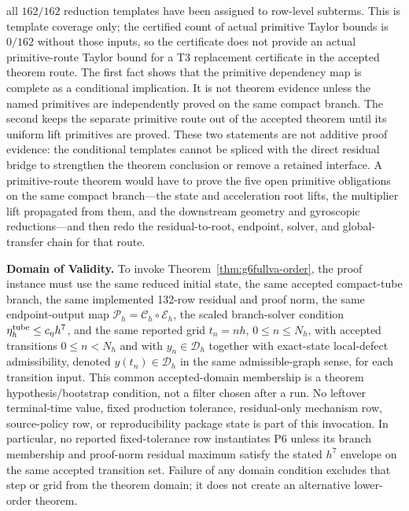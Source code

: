 \documentclass[preprint,12pt]{elsarticle}
\begin{document}
all \(162/162\) reduction
templates have been assigned to row-level subterms. This is template
coverage only; the certified count of actual primitive Taylor bounds is \(0/162\) without
those inputs, so the certificate does not provide an actual primitive-route
Taylor bound for a T3 replacement certificate in the accepted theorem route.
The first fact shows that the primitive dependency map is complete as a
conditional implication. It is not theorem evidence unless the named
primitives are independently proved on the same compact branch. The second keeps the
separate primitive route out of the accepted theorem until its uniform lift
primitives are proved. These
two statements are not additive proof evidence: the conditional templates
cannot be spliced with the direct residual bridge to strengthen the theorem
conclusion or remove a retained interface.
A primitive-route theorem would have to prove the five open primitive
obligations on the same compact branch---the state and acceleration root
lifts, the multiplier lift propagated from them, and the downstream geometry
and gyroscopic reductions---and then redo the residual-to-root, endpoint,
solver, and global-transfer chain for that route.

\noindent\textbf{Domain of Validity.}
To invoke Theorem~\ref{thm:g6fullva-order}, the proof instance must use the
same reduced initial state, the same accepted compact-tube branch, the same
implemented 132-row residual and proof norm, the same endpoint-output map
\(\mathcal P_h=\mathcal C_h\circ\mathcal E_h\), the scaled branch-solver
condition \(\eta_h^{\rm tube}\le c_\eta h^7\), and the same reported grid
\(t_n=nh\), \(0\le n\le N_h\), with accepted transitions \(0\le n<N_h\)
and with \(y_n\in\mathcal D_h\) together with exact-state local-defect
admissibility, denoted \(y(t_n)\in\mathcal D_h\) in the same admissible-graph
sense, for each transition input.
This common accepted-domain membership is a theorem
hypothesis/bootstrap condition, not a filter chosen after a run.
No leftover terminal-time value, fixed production tolerance, residual-only
mechanism row, source-policy row, or reproducibility package state is part of this
invocation. In particular, no reported fixed-tolerance row instantiates P6
unless its branch membership and proof-norm residual maximum satisfy the
stated \(h^7\) envelope on the same accepted transition set. Failure of any
domain condition excludes that step or grid from the theorem domain; it does not
create an alternative lower-order theorem.
\end{document}
